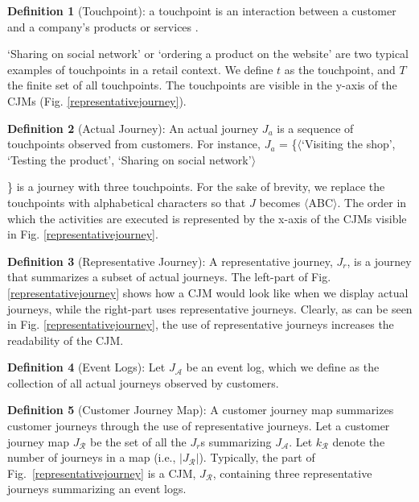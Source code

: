 \documentclass[runningheads]{llncs}
\begin{document}
\textbf{Definition 1} (Touchpoint): a touchpoint is an interaction between a customer and a company's products or services \cite{bernard2017cjm}. {`Sharing on social network' or `ordering a product on the website' are two typical examples of touchpoints in a retail context. We define $t$ as the touchpoint, and $T$ the finite set of all touchpoints. The touchpoints are visible in the y-axis of the CJMs (Fig. \ref{representativejourney}).

\textbf{Definition 2} (Actual Journey): An actual journey $J_a$ is a sequence of touchpoints observed from customers. For instance, $J_a$ = \{$\langle$`Visiting the shop', `Testing the product', `Sharing on social network'$\rangle$}\} is a journey with three touchpoints. For the sake of brevity, we replace the touchpoints with alphabetical characters so that $J$ becomes $\langle$ABC$\rangle$. The order in which the activities are executed is represented by the x-axis of the CJMs visible in Fig. \ref{representativejourney}.

\textbf{Definition 3} (Representative Journey): A representative journey, $J_{r}$, is a journey that summarizes a subset of actual journeys. The left-part of Fig. \ref{representativejourney} shows how a CJM would look like when we display actual journeys, while the right-part uses representative journeys. Clearly, as can be seen in Fig. \ref{representativejourney}, the use of  representative journeys increases the readability of the CJM. 

\textbf{Definition 4} (Event Logs): Let $J_{\mathcal{A}}$ be an event log, which we define as the collection of all actual journeys observed by customers. 

\textbf{Definition 5} (Customer Journey Map): A customer journey map summarizes customer journeys through the use of representative journeys. Let a customer journey map $J_{\mathcal{R}}$ be the set of all the $J_{r}$s summarizing $J_{\mathcal{A}}$. Let $k_{\mathcal{R}}$ denote the number of journeys in a map (i.e., $|J_{\mathcal{R}}|$). Typically, the part  of Fig.~\ref{representativejourney} is a CJM, $J_{\mathcal{R}}$, containing three representative journeys summarizing an event logs.
\end{document}
